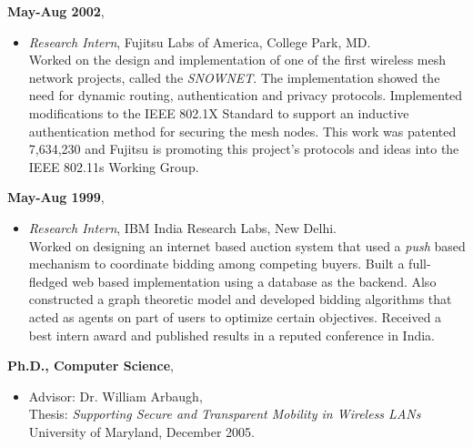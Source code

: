 \begin{resume}
\begin{itemize}

   \end{itemize}

 {\bf May-Aug 2002},   	
    \begin{itemize}
         \item[] {\it Research Intern}, Fujitsu Labs of America, College Park, MD.\\
		Worked on the design and implementation of one of the first wireless mesh network projects, called the {\em SNOWNET}.
	        The implementation showed the need for dynamic routing, authentication and privacy protocols. Implemented modifications to the IEEE 802.1X Standard
                to support an inductive authentication method for securing the mesh nodes. This work was patented 7,634,230 and Fujitsu is promoting this project's
                protocols and ideas into the IEEE 802.11s Working Group.
		
    \end{itemize}

 {\bf May-Aug 1999},   	
    \begin{itemize}
         \item[] {\it Research Intern},  IBM India Research Labs, New Delhi.\\
		Worked on designing an internet based auction system that used a {\em push} based mechanism to
                coordinate bidding among competing buyers. Built a full-fledged web based implementation using a database as the
                backend. Also constructed a graph theoretic model and developed bidding algorithms that
                acted as agents on part of users to optimize certain
		objectives. Received a best intern award and published results
		in a reputed conference in India.
    \end{itemize}

{\bf Ph.D., Computer Science},
    \begin{itemize}
         \item[] Advisor: Dr. William Arbaugh, \\
		 Thesis: {\em Supporting Secure and Transparent Mobility in Wireless LANs} \\
                 University of Maryland, December 2005.
    \end{itemize}


\end{resume}
